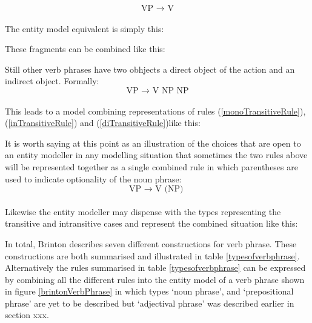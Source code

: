 \begin{equation}
\label{inTransitiveRule}
\text{VP  $\longrightarrow$   V}
\end{equation} \\

\noindent The entity model equivalent is simply this:

\noindent These fragments can be combined like this:

\begin{center}

\end{center}
Still other verb phrases have two obhjects a direct object of the action and an indirect object. Formally: \\

\begin{equation}
\label{diTransitiveRule}
\text{VP  $\longrightarrow$   V  NP NP}
\end{equation} \\

\noindent This leads to a model combining representations of rules (\ref{monoTransitiveRule}), (\ref{inTransitiveRule}) and (\ref{diTransitiveRule})like this:


\begin{center}

\end{center}


\noindent It is worth saying at this point as an illustration of the choices that are open to an entity modeller in any modelling situation that sometimes the two rules above will be represented together
as a single combined rule in which parentheses are used to indicate optionality of the noun phrase: \\

\begin{equation}
\label{alternateRule}
\text{VP  $\longrightarrow$   V  (NP) }
\end{equation} \\

\noindent Likewise the entity modeller may dispense with the types representing the transitive and intransitive cases and represent the combined situation like this:

\begin{center}

\end{center}
\noindent In total, Brinton describes seven different constructions for verb phrase. These constructions are both summarised and illustrated in table \ref{typesofverbphrase}. Alternatively the rules summarised in table \ref{typesofverbphrase} can be expressed by combining all the different rules into the entity model of a verb phrase shown in figure  
\ref{brintonVerbPhrase} in which types `noun phrase', and `prepositional phrase' are yet to be described but `adjectival phrase' was described earlier in section xxx.

